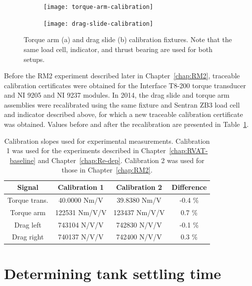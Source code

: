\begin{figure}
    \centering
    \begin{subfigure}{0.9\textwidth}
        \texttt{[image: torque-arm-calibration]} \caption{}
    \end{subfigure}

    \begin{subfigure}{0.9\textwidth}
        \texttt{[image: drag-slide-calibration]}
        \caption{}
    \end{subfigure}

    \caption{Torque arm (a) and drag slide (b) calibration fixtures. Note that
        the same load cell, indicator, and thrust bearing are used for both setups.}

    \label{fig:calibration-fixtures}
\end{figure}

Before the RM2 experiment described later in Chapter~\ref{chap:RM2}, traceable
calibration certificates were obtained for the Interface T8-200 torque
transducer and NI 9205 and NI 9237 modules. In 2014, the drag slide and torque
arm assemblies were recalibrated using the same fixture and Sentran ZB3 load
cell and indicator described above, for which a new traceable calibration
certificate was obtained. Values before and after the recalibration are
presented in Table~\ref{tab:calibrations}.

\begin{table}
    \centering
\begin{tabular}{c|c|c|c}
    Signal & Calibration 1 & Calibration 2 & Difference \\
    \hline
    Torque trans. & 40.0000 Nm/V & 39.8380 Nm/V & -0.4 \% \\
    Torque arm & 122531 Nm/V/V & 123437 Nm/V/V & 0.7 \% \\
    Drag left & 743104 N/V/V & 742830 N/V/V & -0.1 \% \\
    Drag right & 740137 N/V/V & 742400 N/V/V & 0.3 \% \\
\end{tabular}
    \caption{Calibration slopes used for experimental measurements. Calibration
        1 was used for the experiments described in Chapter~\ref{chap:RVAT-baseline}
        and Chapter~\ref{chap:Re-dep}. Calibration 2 was used for those in
        Chapter~\ref{chap:RM2}.}

    \label{tab:calibrations}
\end{table}


\section{Determining tank settling time}

